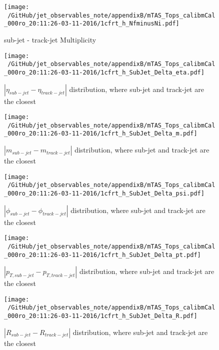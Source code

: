 \begin{figure}
 
\texttt{[image: ~/GitHub/jet\_observables\_note/appendixB/mTAS\_Tops\_calibmCal\_000ro\_20:11:26-03-11-2016/1cfrt\_h\_NfminusNi.pdf]}
\caption{sub-jet - track-jet Multiplicity}
 
\end{figure}

\clearpage %

\begin{figure}
 
\texttt{[image: ~/GitHub/jet\_observables\_note/appendixB/mTAS\_Tops\_calibmCal\_000ro\_20:11:26-03-11-2016/1cfrt\_h\_SubJet\_Delta\_eta.pdf]}
\caption{$| \eta_{sub-jet} - \eta_{track-jet} | $ distribution, where sub-jet and track-jet are the closest}
 
\end{figure}
 
\begin{figure}
 
\texttt{[image: ~/GitHub/jet\_observables\_note/appendixB/mTAS\_Tops\_calibmCal\_000ro\_20:11:26-03-11-2016/1cfrt\_h\_SubJet\_Delta\_m.pdf]}
\caption{$| m_{sub-jet} - m_{track-jet} |$ distribution, where sub-jet and track-jet are the closest}
 
\end{figure}
 
\begin{figure}
 
\texttt{[image: ~/GitHub/jet\_observables\_note/appendixB/mTAS\_Tops\_calibmCal\_000ro\_20:11:26-03-11-2016/1cfrt\_h\_SubJet\_Delta\_psi.pdf]}
\caption{$| \phi_{sub-jet} - \phi_{track-jet} | $ distribution, where sub-jet and track-jet are the closest}
 
\end{figure}
\begin{figure}
 
\texttt{[image: ~/GitHub/jet\_observables\_note/appendixB/mTAS\_Tops\_calibmCal\_000ro\_20:11:26-03-11-2016/1cfrt\_h\_SubJet\_Delta\_pt.pdf]}
\caption{$| p_{T,sub-jet} - p_{T,track-jet} | $ distribution, where sub-jet and track-jet are the closest}
 
\end{figure}
 
\begin{figure}
 
\texttt{[image: ~/GitHub/jet\_observables\_note/appendixB/mTAS\_Tops\_calibmCal\_000ro\_20:11:26-03-11-2016/1cfrt\_h\_SubJet\_Delta\_R.pdf]}
\caption{$| R_{sub-jet} - R_{track-jet} | $ distribution, where sub-jet and track-jet are the closest}
 
\end{figure}
 

